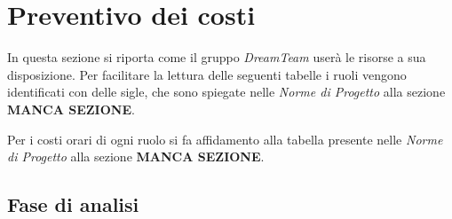 \section{Preventivo dei costi}
In questa sezione si riporta come il gruppo \textit{DreamTeam} userà le risorse a sua disposizione.  Per facilitare la lettura delle seguenti tabelle i ruoli vengono identificati con delle sigle,  che sono spiegate nelle \textit{Norme di Progetto} alla sezione \textbf{MANCA SEZIONE}.

Per i costi orari di ogni ruolo si fa affidamento alla tabella presente nelle \textit{Norme di Progetto} alla sezione \textbf{MANCA SEZIONE}.

\subsection{Fase di analisi}
